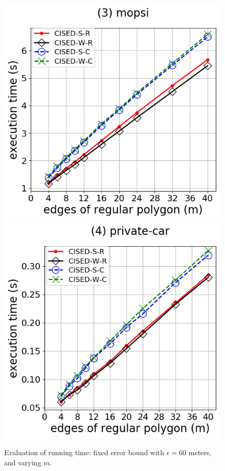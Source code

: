\begin{figure}[tb!]
\includegraphics[scale = 0.30]{Figures/Exp-M-e-60-time-mopsi.png}
\includegraphics[scale = 0.30]{Figures/Exp-M-e-60-time-private.png}
\vspace{-1ex}
\caption{\small Evaluation of running time: fixed error bound with $\epsilon=60$ meters, and varying $m$. }
\label{fig:m-time-e60}
\vspace{-1ex}
\end{figure}




